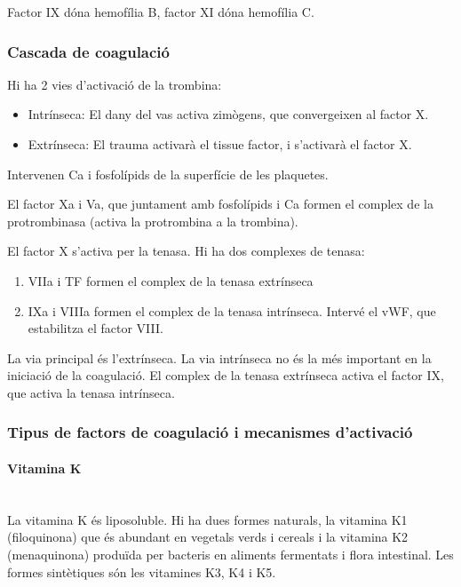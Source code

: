 Factor IX dóna hemofília B, factor XI dóna hemofília C.

\subsubsection{Cascada de coagulació}
\label{sec:casc-de-coag}
Hi ha 2 vies d'activació de la trombina:
\begin{itemize}
\item Intrínseca: El dany del vas activa zimògens, que convergeixen al
  factor X.
\item Extrínseca: El trauma activarà el tissue factor, i s'activarà el
  factor X. 
\end{itemize}

Intervenen Ca i fosfolípids de la superfície de les plaquetes.

El factor Xa i Va, que juntament amb fosfolípids i Ca formen el
complex de la protrombinasa (activa la protrombina a la trombina).

El factor X s'activa per la tenasa. Hi ha dos complexes de tenasa:
\begin{enumerate}
\item VIIa i TF formen el complex de la tenasa extrínseca
\item IXa i VIIIa formen el complex de la tenasa intrínseca. Intervé
  el vWF, que estabilitza el factor VIII.
\end{enumerate}

La via principal és l'extrínseca. La via intrínseca no és la més
important en la iniciació de la coagulació. El complex de la tenasa
extrínseca activa el factor IX, que activa la tenasa intrínseca.

\subsubsection{Tipus de factors de coagulació i mecanismes
  d'activació}
\label{sec:tipus-de-factors}

\paragraph{Vitamina K} \hfill \\
La vitamina K és liposoluble. Hi ha dues formes naturals, la vitamina
K1 (filoquinona) que és abundant en vegetals verds i cereals i la
vitamina K2 (menaquinona) produïda per bacteris en aliments fermentats
i flora intestinal. Les formes sintètiques són les vitamines K3, K4 i
K5.

